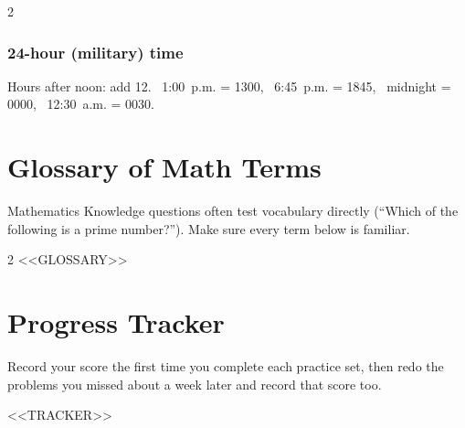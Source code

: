 \begin{multicols}{2}
\subsection*{24-hour (military) time}
Hours after noon: add 12. \ 1:00~p.m. = 1300, \ 6:45~p.m. = 1845,
\ midnight = 0000, \ 12:30~a.m. = 0030.
\end{multicols}

\chapter*{Glossary of Math Terms}

Mathematics Knowledge questions often test vocabulary directly (``Which of
the following is a prime number?''). Make sure every term below is familiar.

\begin{multicols}{2}\small
\setlength{\parskip}{0.3em}
<<GLOSSARY>>
\end{multicols}

\chapter*{Progress Tracker}

Record your score the first time you complete each practice set, then redo
the problems you missed about a week later and record that score too.

\begin{center}\small\renewcommand{\arraystretch}{1.42}
<<TRACKER>>
\end{center}

